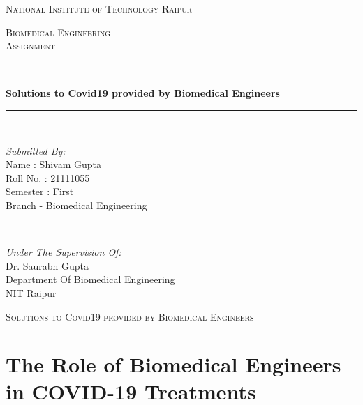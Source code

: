 \documentclass[12pt]{article}
\begin{document}
\begin{titlepage}
\newcommand{\HRule}{\rule{\linewidth}{0.5mm}}
\center
\textsc{\LARGE National Institute of Technology Raipur}\\[1.0cm]
\begin{figure}[h]
\centering
\end{figure}
\textsc{\Large Biomedical Engineering}\\[0.5cm] 
\textsc{\large Assignment}\\[0.5cm]
\HRule\\[0.4cm]
	
	{\huge\bfseries Solutions to Covid19 provided by Biomedical Engineers }\\[0.1cm]
	\HRule\\[1.1cm]
	\begin{minipage}{0.3\textwidth}
		\begin{flushleft}
			\large
			\textit{Submitted By:}\\
          		Name : Shivam Gupta \\
			   Roll No. : 21111055\\
			   Semester : First\\
			   Branch - Biomedical Engineering 
			   
			\end{flushleft}
	\end{minipage}
	~
	\begin{minipage}{0.5\textwidth}
		\begin{flushright}
			\large
			\textit{Under The Supervision Of:}\\
			Dr. Saurabh Gupta\\
			Department Of Biomedical Engineering\\
			NIT Raipur
		\end{flushright}
	\end{minipage}
	\vfill\vfill\vfill 
	
	
	\vfill 
\end{titlepage}


\clearpage
\newpage





\textsc{\Large Solutions to Covid19 provided by Biomedical Engineers}\\[0.1cm]


\section*{The Role of Biomedical Engineers in COVID-19 Treatments}
\end{document}
